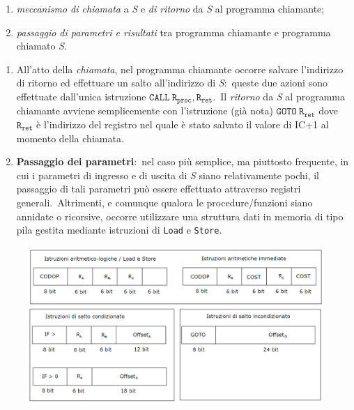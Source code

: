 \begin{enumerate}
    \item \textit{meccanismo di chiamata} a \textit{S} e \textit{di ritorno} da \textit{S} al programma chiamante;
    \item \textit{passaggio di parametri e risultati} tra programma chiamante e programma chiamato \textit{S}.
\end{enumerate}
\begin{enumerate}
    \item All'atto della \textit{chiamata}, nel programma chiamante occorre salvare l'indirizzo di ritorno ed effettuare un salto all'indirizzo di \textit{S}:\ queste due azioni sono effettuate dall'unica istruzione $\mathtt{CALL\ R_{proc}}, \mathtt{R_{ret}}$.\ Il \textit{ritorno} da \textit{S} al programma chiamante avviene semplicemente con l'istruzione (già nota) $\mathtt{GOTO\ R_{ret}}$ dove $\mathtt{R_{ret}}$ è l'indirizzo del registro nel quale è stato salvato il valore di IC+1 al momento della chiamata.
    \item \textbf{Passaggio dei parametri}:\ nel caso più semplice, ma piuttosto frequente, in cui i parametri di ingresso e di uscita di \textit{S} siano relativamente pochi, il passaggio di tali parametri può essere effettuato attraverso registri generali.\ Altrimenti, e comunque qualora le procedure/funzioni siano annidate o ricorsive, occorre utilizzare una struttura dati in memoria di tipo pila gestita mediante istruzioni di \texttt{Load} e \texttt{Store}.
\end{enumerate}

\begin{figure}[H]
    \centering
    \includegraphics[width=\textwidth]{immagini/Istruzioni.png}
\end{figure}



